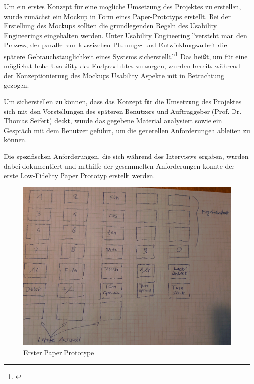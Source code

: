 Um ein erstes Konzept für eine mögliche Umsetzung des Projektes zu erstellen, wurde zunächst ein Mockup in Form eines Paper-Prototyps erstellt. Bei der Erstellung des Mockups sollten die grundlegenden Regeln des Usability Engineerings eingehalten werden. Unter Usability Engineering ''versteht man den Prozess, der parallel zur klassischen Planungs- und Entwicklungsarbeit die spätere Gebrauchstauglichkeit eines Systems sicherstellt.''\footnote{\cite[][]{handbuchusability2007}} Das heißt, um für eine möglichst hohe Usability des Endproduktes zu sorgen, wurden bereits während der Konzeptionierung des Mockups Usability Aspekte mit in Betrachtung gezogen. 

Um sicherstellen zu können, dass das Konzept für die Umsetzung des Projektes sich mit den Vorstellungen des späteren Benutzers und Auftraggeber (Prof. Dr. Thomas Seifert) deckt, wurde das gegebene Material analysiert sowie ein Gespräch mit dem Benutzer geführt, um die generellen Anforderungen ableiten zu können. 

Die spezifischen Anforderungen, die sich während des Interviews ergaben, wurden dabei dokumentiert und mithilfe der gesammelten Anforderungen konnte der erste Low-Fidelity Paper Prototyp erstellt werden.


\begin{figure}[!h]
	\includegraphics[width=1\columnwidth]{img/planung-mockup-erster-mockup}
	\caption[Erster Paper Prototype]{Erster Paper Prototype\footnotemark}
\end{figure}

